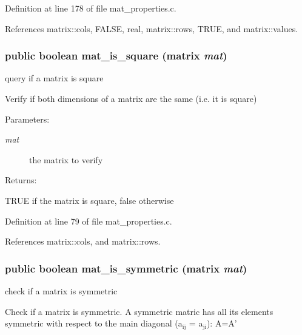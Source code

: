 Definition at line 178 of file mat\_\-properties.c.

References matrix::cols, FALSE, real, matrix::rows, TRUE, and matrix::values.
\subsubsection{\setlength{\rightskip}{0pt plus 5cm}public {\bf boolean} mat\_\-is\_\-square ({\bf matrix} {\em mat})}\label{group__matrix__properties_a0}


query if a matrix is square

Verify if both dimensions of a matrix are the same (i.e. it is square)\begin{Desc}
\item[Parameters: ]\par
\begin{description}
\item[{\em 
mat}]the matrix to verify\end{description}
\end{Desc}
\begin{Desc}
\item[Returns: ]\par
TRUE if the matrix is square, false otherwise \end{Desc}


Definition at line 79 of file mat\_\-properties.c.

References matrix::cols, and matrix::rows.
\subsubsection{\setlength{\rightskip}{0pt plus 5cm}public {\bf boolean} mat\_\-is\_\-symmetric ({\bf matrix} {\em mat})}\label{group__matrix__properties_a1}


check if a matrix is symmetric

Check if a matrix is symmetric. A symmetric matric has all its elements symmetric with respect to the main diagonal (a$_{\mbox{ij}}$ = a$_{\mbox{ji}}$): A=A'

